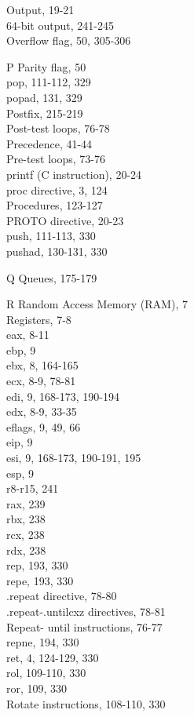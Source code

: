 \documentclass[10pt]{book}
\begin{document}
Output, 19-21\\
64-bit output, 241-245\\
Overflow flag, 50, 305-306

P
Parity flag, 50\\
pop, 111-112, 329\\
popad, 131, 329\\
Postfix, 215-219\\
Post-test loops, 76-78\\
Precedence, 41-44\\
Pre-test loops, 73-76\\
printf (C instruction), 20-24\\
proc directive, 3, 124\\
Procedures, 123-127\\
PROTO directive, 20-23\\
push, 111-113, 330\\
pushad, 130-131, 330

Q
Queues, 175-179

R
Random Access Memory (RAM), 7\\
Registers, 7-8\\
eax, 8-11\\
ebp, 9\\
ebx, 8, 164-165\\
ecx, 8-9, 78-81\\
edi, 9, 168-173, 190-194\\
edx, 8-9, 33-35\\
eflags, 9, 49, 66\\
eip, 9\\
esi, 9, 168-173, 190-191, 195\\
esp, 9\\
r8-r15, 241\\
rax, 239\\
rbx, 238\\
rcx, 238\\
rdx, 238\\
rep, 193, 330\\
repe, 193, 330\\
.repeat directive, 78-80\\
.repeat-.untilcxz directives, 78-81\\
Repeat- until instructions, 76-77\\
repne, 194, 330\\
ret, 4, 124-129, 330\\
rol, 109-110, 330\\
ror, 109, 330\\
Rotate instructions, 108-110, 330
\end{document}
